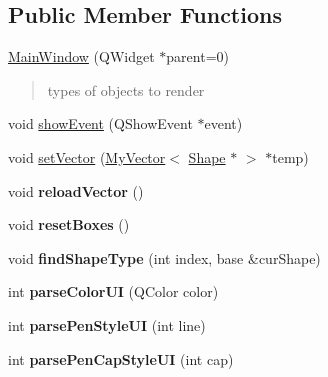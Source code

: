 \subsection*{Public Member Functions}
\begin{DoxyCompactItemize}
\item 
\hyperlink{classMainWindow_a8b244be8b7b7db1b08de2a2acb9409db}{Main\-Window} (Q\-Widget $\ast$parent=0)
\begin{DoxyCompactList}\small\item\em \begin{quotation}
types of objects to render \end{quotation}
\end{DoxyCompactList}\item 
void \hyperlink{classMainWindow_a3dfe834b2836b316908ace3f38c06db2}{show\-Event} (Q\-Show\-Event $\ast$event)
\item 
void \hyperlink{classMainWindow_a5fb4bbae0c6be3fcc88900c8956173db}{set\-Vector} (\hyperlink{classnserkkvector_1_1MyVector}{My\-Vector}$<$ \hyperlink{classShape}{Shape} $\ast$ $>$ $\ast$temp)
\item 
\hypertarget{classMainWindow_a4205e879c75cff5f992f0f9c9accffc7}{void {\bfseries reload\-Vector} ()}\label{classMainWindow_a4205e879c75cff5f992f0f9c9accffc7}

\item 
\hypertarget{classMainWindow_ad092112c7cfcf4f3474b8b5d75e258e5}{void {\bfseries reset\-Boxes} ()}\label{classMainWindow_ad092112c7cfcf4f3474b8b5d75e258e5}

\item 
\hypertarget{classMainWindow_a5727c016b39aa3ad3dbc51d2440a9692}{void {\bfseries find\-Shape\-Type} (int index, base \&cur\-Shape)}\label{classMainWindow_a5727c016b39aa3ad3dbc51d2440a9692}

\item 
\hypertarget{classMainWindow_a2435d4d8d9eb0daff64af2e866c65a10}{int {\bfseries parse\-Color\-U\-I} (Q\-Color color)}\label{classMainWindow_a2435d4d8d9eb0daff64af2e866c65a10}

\item 
\hypertarget{classMainWindow_a1e59ba22fd6f5b285dd7f0f4354f5595}{int {\bfseries parse\-Pen\-Style\-U\-I} (int line)}\label{classMainWindow_a1e59ba22fd6f5b285dd7f0f4354f5595}

\item 
\hypertarget{classMainWindow_ae73b1516484e6df359012bb4921a94d3}{int {\bfseries parse\-Pen\-Cap\-Style\-U\-I} (int cap)}\label{classMainWindow_ae73b1516484e6df359012bb4921a94d3}


\end{DoxyCompactItemize}
